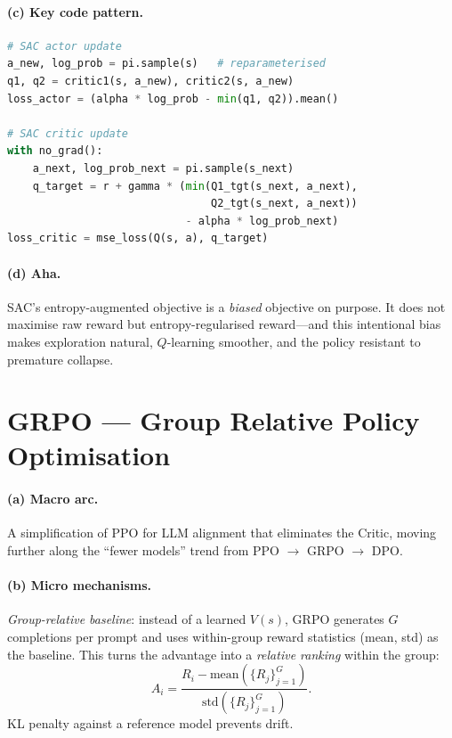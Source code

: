 \paragraph{(c) Key code pattern.}

\begin{lstlisting}[language=Python]
# SAC actor update
a_new, log_prob = pi.sample(s)   # reparameterised
q1, q2 = critic1(s, a_new), critic2(s, a_new)
loss_actor = (alpha * log_prob - min(q1, q2)).mean()

# SAC critic update
with no_grad():
    a_next, log_prob_next = pi.sample(s_next)
    q_target = r + gamma * (min(Q1_tgt(s_next, a_next),
                                Q2_tgt(s_next, a_next))
                            - alpha * log_prob_next)
loss_critic = mse_loss(Q(s, a), q_target)
\end{lstlisting}

\paragraph{(d) Aha.}
SAC's entropy-augmented objective is a \emph{biased} objective on purpose.
It does not maximise raw reward but entropy-regularised reward---and this intentional bias makes exploration natural, $Q$-learning smoother, and the policy resistant to premature collapse.

\section{GRPO --- Group Relative Policy Optimisation}
\label{sec:grpo}

\paragraph{(a) Macro arc.}
A simplification of PPO for LLM alignment that eliminates the Critic, moving further along the ``fewer models'' trend from PPO $\to$ GRPO $\to$ DPO.

\paragraph{(b) Micro mechanisms.}
\emph{Group-relative baseline}: instead of a learned $V(s)$, GRPO generates $G$ completions per prompt and uses within-group reward statistics (mean, std) as the baseline.
This turns the advantage into a \emph{relative ranking} within the group:
\[
  A_i = \frac{R_i - \text{mean}(\{R_j\}_{j=1}^G)}{\text{std}(\{R_j\}_{j=1}^G)}.
\]
KL penalty against a reference model prevents drift.


